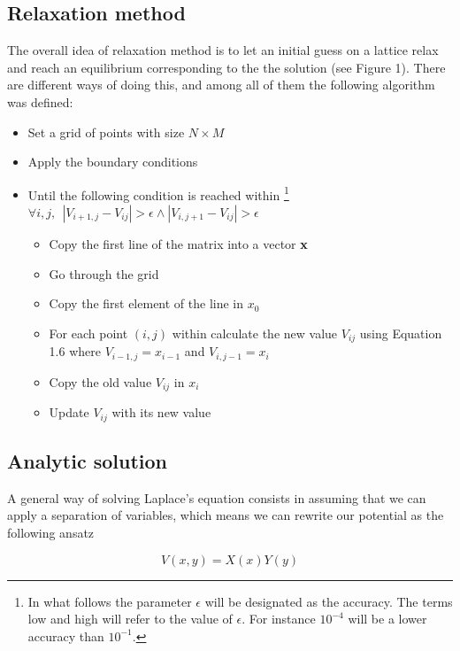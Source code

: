 \documentclass[10 pt]{article}
\numberwithin{equation}{section}
\begin{document}
\begin{multicols}{2}

\subsection{Relaxation method}

The overall idea of relaxation method is to let an initial guess on a lattice relax and reach an equilibrium corresponding to the the solution (see Figure 1). There are different ways of doing this, and among all of them the following algorithm was defined:

\begin{itemize}
\item Set a grid of points with size $N \times M$
\item Apply the boundary conditions
\item Until the following condition is reached within \footnote{In what follows the parameter $\epsilon$ will be designated as the accuracy. The terms low and high will refer to the value of $\epsilon$. For instance $10^{-4}$ will be a lower accuracy than $10^{-1}$.} $\forall i,j,\ \ | V_{i+1,j} - V_{ij} |>\epsilon \land | V_{i,j+1} - V_{ij}| > \epsilon$ 
\begin{itemize}
\item Copy the first line of the matrix into a vector $\bf x$\rm
\item Go through the grid
\item Copy the first element of the line in $x_0$
\item For each point $(i,j)$ within calculate the new value $V_{ij}$ using Equation 1.6 where 
$V_{i-1,j} = x_{i-1}$ and $V_{i,j-1} = x_{i}$
\item Copy the old value $V_{ij}$ in $x_i$
\item Update $V_{ij}$ with its new value
\end{itemize}
\end{itemize}

\subsection{Analytic solution}

A general way of solving Laplace's equation consists in assuming that we can apply a separation of variables, which means we can rewrite our potential as the following ansatz

\begin{equation}
V(x,y) = X(x) Y(y)
\end{equation}
 

\end{multicols}
\end{document}
